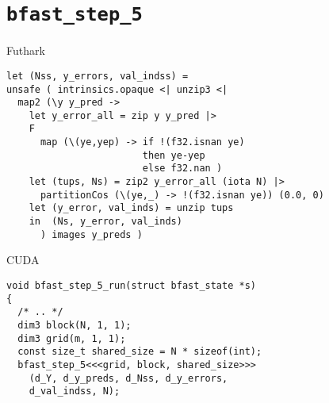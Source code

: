 \section{\texttt{bfast\_step\_5}} %


\begin{frame}[fragile]{Futhark}

%
\begin{verbatim}
let (Nss, y_errors, val_indss) =
unsafe ( intrinsics.opaque <| unzip3 <|
  map2 (\y y_pred ->
    let y_error_all = zip y y_pred |>
    F
      map (\(ye,yep) -> if !(f32.isnan ye) 
                        then ye-yep 
                        else f32.nan )
    let (tups, Ns) = zip2 y_error_all (iota N) |>
      partitionCos (\(ye,_) -> !(f32.isnan ye)) (0.0, 0)
    let (y_error, val_inds) = unzip tups
    in  (Ns, y_error, val_inds)
      ) images y_preds )
\end{verbatim}

\end{frame}

\begin{frame}[fragile]{CUDA}

\begin{verbatim}
void bfast_step_5_run(struct bfast_state *s)
{
  /* .. */
  dim3 block(N, 1, 1);
  dim3 grid(m, 1, 1);
  const size_t shared_size = N * sizeof(int);
  bfast_step_5<<<grid, block, shared_size>>>
    (d_Y, d_y_preds, d_Nss, d_y_errors,
    d_val_indss, N);
\end{verbatim}

\end{frame}

